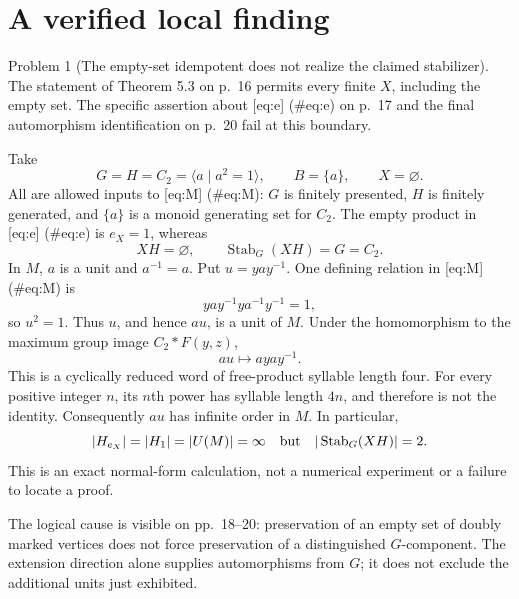 \documentclass[10pt]{article}
\begin{document}
\section*{A verified local finding}
Problem 1 (The empty-set idempotent does not realize the claimed stabilizer).  The statement of Theorem 5.3 on p. 16 permits every finite \(X\), including the empty set. The specific assertion about [eq:e] (\#eq:e) on p. 17 and the final automorphism identification on p. 20 fail at this boundary.\par
Take \[G=H=C_2=\langle a\mid a^2=1\rangle,\qquad B=\{a\},\qquad X=\varnothing .\] All are allowed inputs to [eq:M] (\#eq:M): \(G\) is finitely presented, \(H\) is finitely generated, and \(\{a\}\) is a monoid generating set for \(C_2\). The empty product in [eq:e] (\#eq:e) is \(e_X=1\), whereas \[XH=\varnothing,\qquad \operatorname{Stab}_G(XH)=G=C_2.\] In \(M\), \(a\) is a unit and \(a^{-1}=a\). Put \(u=yay^{-1}\). One defining relation in [eq:M] (\#eq:M) is \[yay^{-1}ya^{-1}y^{-1}=1,\] so \(u^2=1\). Thus \(u\), and hence \(au\), is a unit of \(M\). Under the homomorphism to the maximum group image \(C_2*F(y,z)\), \[au\longmapsto ayay^{-1}.\] This is a cyclically reduced word of free-product syllable length four. For every positive integer \(n\), its \(n\)th power has syllable length \(4n\), and therefore is not the identity. Consequently \(au\) has infinite order in \(M\). In particular, \[|H_{e_X}|=|H_1|=|U(M)|=\infty
 \quad\hbox{but}\quad |\operatorname{Stab}_G(XH)|=2.\] This is an exact normal-form calculation, not a numerical experiment or a failure to locate a proof.\par
The logical cause is visible on pp. 18–20: preservation of an empty set of doubly marked vertices does not force preservation of a distinguished \(G\)-component. The extension direction alone supplies automorphisms from \(G\); it does not exclude the additional units just exhibited.\par
\end{document}
